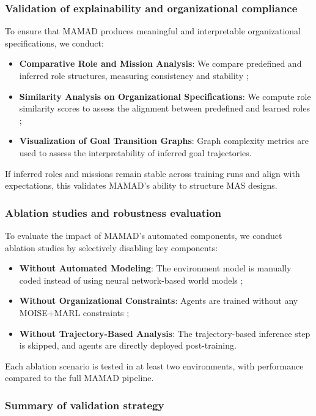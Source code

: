 \documentclass[pdflatex,sn-mathphys-num]{sn-jnl}%
\theoremstyle{thmstyleone}%
\theoremstyle{thmstyletwo}%
\theoremstyle{thmstylethree}%
\begin{document}
\subsubsection{Validation of explainability and organizational compliance}
To ensure that MAMAD produces meaningful and interpretable organizational specifications, we conduct:
\begin{itemize}
    \item \textbf{Comparative Role and Mission Analysis}: We compare predefined and inferred role structures, measuring consistency and stability ;
    \item \textbf{Similarity Analysis on Organizational Specifications}: We compute role similarity scores to assess the alignment between predefined and learned roles ;
    \item \textbf{Visualization of Goal Transition Graphs}: Graph complexity metrics are used to assess the interpretability of inferred goal trajectories.
\end{itemize}

If inferred roles and missions remain stable across training runs and align with expectations, this validates MAMAD's ability to structure MAS designs.

\subsubsection{Ablation studies and robustness evaluation}
To evaluate the impact of MAMAD's automated components, we conduct ablation studies by selectively disabling key components:
\begin{itemize}
    \item \textbf{Without Automated Modeling}: The environment model is manually coded instead of using neural network-based world models ;
    \item \textbf{Without Organizational Constraints}: Agents are trained without any MOISE+MARL constraints ;
    \item \textbf{Without Trajectory-Based Analysis}: The trajectory-based inference step is skipped, and agents are directly deployed post-training.
\end{itemize}

Each ablation scenario is tested in at least two environments, with performance compared to the full MAMAD pipeline.


\subsubsection{Summary of validation strategy}
\end{document}
